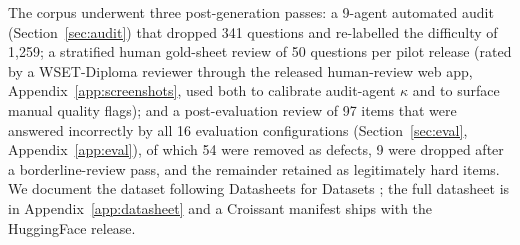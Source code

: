 The corpus underwent three post-generation passes: a 9-agent automated
audit (Section~\ref{sec:audit}) that dropped 341 questions and
re-labelled the difficulty of 1{,}259; a stratified human gold-sheet
review of 50 questions per pilot release (rated by a WSET-Diploma
reviewer through the released human-review web app,
Appendix~\ref{app:screenshots}, used both to calibrate audit-agent
$\kappa$ and to surface manual quality flags); and a post-evaluation
review of 97 items that were answered incorrectly by all 16 evaluation
configurations (Section~\ref{sec:eval}, Appendix~\ref{app:eval}), of
which 54 were removed as defects, 9 were dropped after a
borderline-review pass, and the remainder retained as legitimately
hard items. We document the dataset following Datasheets for Datasets
\citep{gebru2021datasheets}; the full datasheet is in
Appendix~\ref{app:datasheet} and a Croissant manifest
\citep{koehn2024croissant} ships with the HuggingFace release.
